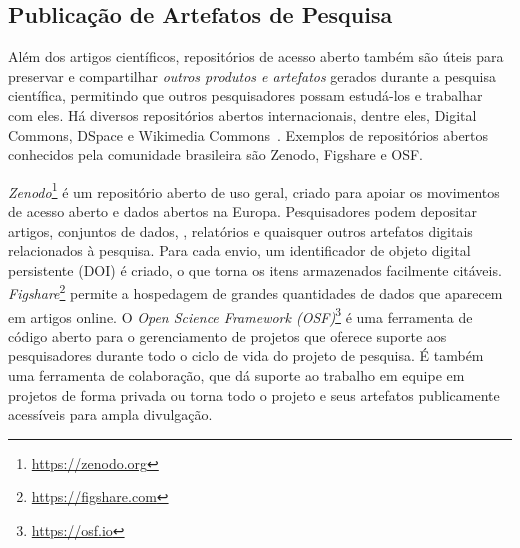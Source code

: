 \subsection*{Publicação de Artefatos de Pesquisa}

Além dos artigos científicos, repositórios de acesso aberto também são úteis para preservar e compartilhar \textit{outros produtos e artefatos} gerados durante a pesquisa científica,  permitindo que outros pesquisadores possam estudá-los e trabalhar com eles.
%
Há diversos repositórios abertos internacionais, dentre eles, 
Digital Commons, DSpace e  Wikimedia Commons~\cite{abdo2015direccoes}.
%
Exemplos de repositórios abertos conhecidos pela comunidade brasileira são Zenodo, Figshare e OSF.

\textit{Zenodo}\footnote{\url{https://zenodo.org}} é um repositório aberto de uso geral, criado para apoiar os movimentos de acesso aberto e dados abertos na Europa.
Pesquisadores podem depositar artigos, conjuntos de dados, \RS, relatórios e quaisquer outros artefatos digitais relacionados à pesquisa. Para cada envio, um identificador de objeto digital persistente (DOI) é criado, o que torna os itens armazenados facilmente citáveis.
%
\textit{Figshare}\footnote{\url{https://figshare.com}} permite a hospedagem de grandes quantidades de dados que aparecem em artigos online.
%
O \textit{Open Science Framework (OSF)}\footnote{\url{https://osf.io}} é uma ferramenta
de código aberto para o gerenciamento de projetos que oferece suporte aos pesquisadores durante todo o ciclo de vida do projeto de pesquisa. 
É também uma ferramenta de colaboração, que dá suporte ao trabalho em equipe em projetos de forma privada ou torna todo o projeto e seus artefatos publicamente acessíveis para ampla divulgação. 



